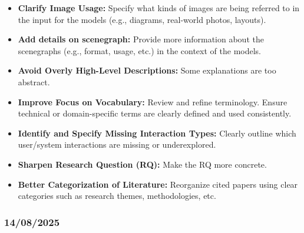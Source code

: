 \documentclass{article}
\begin{document}
\begin{itemize}
    \item \textbf{Clarify Image Usage:} Specify what kinds of images are being referred to in the input for the models (e.g., diagrams, real-world photos, layouts).
    
    \item \textbf{Add details on scenegraph:} Provide more information about the scenegraphs (e.g., format, usage, etc.) in the context of the models.
    
    \item \textbf{Avoid Overly High-Level Descriptions:} Some explanations are too abstract.
    
    \item \textbf{Improve Focus on Vocabulary:} Review and refine terminology. Ensure technical or domain-specific terms are clearly defined and used consistently.
    
    \item \textbf{Identify and Specify Missing Interaction Types:} Clearly outline which user/system interactions are missing or underexplored.
    
    \item \textbf{Sharpen Research Question (RQ):} Make the RQ more concrete.
    
    \item \textbf{Better Categorization of Literature:} Reorganize cited papers using clear categories such as research themes, methodologies, etc.
\end{itemize}

\subsubsection{14/08/2025}    
\end{document}
